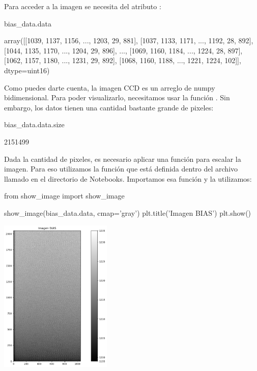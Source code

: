 Para acceder a la imagen se necesita del atributo :
\begin{pyin}
bias_data.data
\end{pyin}
\begin{pyprint}
array([[1039, 1137, 1156, ..., 1203,   29,  881],
       [1037, 1133, 1171, ..., 1192,   28,  892],
       [1044, 1135, 1170, ..., 1204,   29,  896],
       ...,
       [1069, 1160, 1184, ..., 1224,   28,  897],
       [1062, 1157, 1180, ..., 1231,   29,  892],
       [1068, 1160, 1188, ..., 1221, 1224,  102]], dtype=uint16)
\end{pyprint}

Como puedes darte cuenta, la imagen CCD es un arreglo de numpy bidimensional. Para poder visualizarlo, necesitamos usar la función . Sin embargo, los datos tienen una cantidad bastante grande de pixeles:

\begin{pyin}
bias_data.data.size
\end{pyin}
\begin{pyout}
2151499
\end{pyout}

Dada la cantidad de pixeles, es necesario aplicar una función para escalar la imagen. Para eso utilizamos la función  que está definida dentro del archivo llamado  en el directorio de Notebooks. Importamos esa función y la utilizamos:

\begin{pyin}
from show_image import show_image

show_image(bias_data.data, cmap='gray')
plt.title('Imagen BIAS')
plt.show()
\end{pyin}

\noindent
\includegraphics[width=0.4\textwidth]{figures/binary_bias_example.png}

